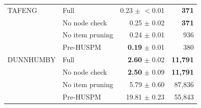 \begin{table}[!htbp]
\begin{tabular*}{\textwidth}{@{\extracolsep\fill}llrr}
TAFENG & Full & 0.23 $\pm$ $<$0.01 & \textbf{371} \\
 & No node check & 0.25 $\pm$ 0.02 & \textbf{371} \\
 & No item pruning & 0.24 $\pm$ 0.01 & 936 \\
 & Pre-HUSPM & \textbf{0.19} $\pm$ 0.01 & 380 \\
DUNNHUMBY & Full & \textbf{2.60} $\pm$ 0.02 & \textbf{11,791} \\
 & No node check & \textbf{2.50} $\pm$ 0.09 & \textbf{11,791} \\
 & No item pruning & 5.79 $\pm$ 0.60 & 87,836 \\
 & Pre-HUSPM & 19.81 $\pm$ 0.23 & 55,843 \\
\bottomrule
\end{tabular*}
\end{table}
